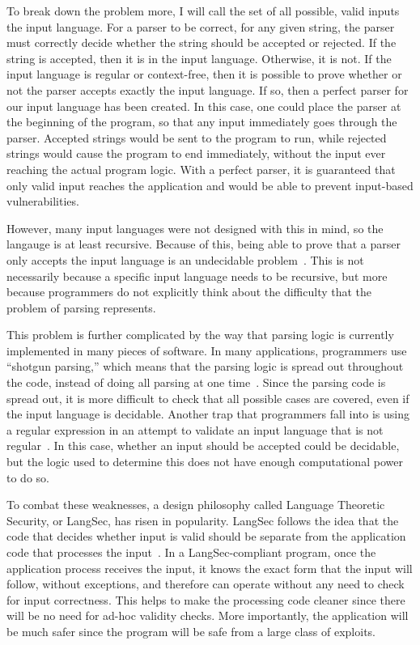 To break down the problem more, I will call the set of all possible, valid inputs the input language.  For a parser to be correct, for any given string, the parser must correctly decide whether the string should be accepted or rejected.  If the string is accepted, then it is in the input language.  Otherwise, it is not.  If the input language is regular or context-free, then it is possible to prove whether or not the parser accepts exactly the input language.  If so, then a perfect parser for our input language has been created.  In this case, one could place the parser at the beginning of the program, so that any input immediately goes through the parser.  Accepted strings would be sent to the program to run, while rejected strings would cause the program to end immediately, without the input ever reaching the actual program logic.  With a perfect parser, it is guaranteed that only valid input reaches the application and would be able to prevent input-based vulnerabilities.

However, many input languages were not designed with this in mind, so the langauge is at least recursive.  Because of this, being able to prove that a parser only accepts the input language is an undecidable problem~\cite{sassaman2011halting}.  This is not necessarily because a specific input language needs to be recursive, but more because programmers do not explicitly think about the difficulty that the problem of parsing represents.

This problem is further complicated by the way that parsing logic is currently implemented in many pieces of software.  In many applications, programmers use ``shotgun parsing,'' which means that the parsing logic is spread out throughout the code, instead of doing all parsing at one time~\cite{bratus2017parsing}.  Since the parsing code is spread out, it is more difficult to check that all possible cases are covered, even if the input language is decidable.  Another trap that programmers fall into is using a regular expression in an attempt to validate an input language that is not regular~\cite{bratus2017parsing}.  In this case, whether an input should be accepted could be decidable, but the logic used to determine this does not have enough computational power to do so.

To combat these weaknesses, a design philosophy called Language Theoretic Security, or LangSec, has risen in popularity.  LangSec follows the idea that the code that decides whether input is valid should be separate from the application code that processes the input~\cite{langsec_language-theoretic_security}.  In a LangSec-compliant program, once the application process receives the input, it knows the exact form that the input will follow, without exceptions, and therefore can operate without any need to check for input correctness.  This helps to make the processing code cleaner since there will be no need for ad-hoc validity checks.  More importantly, the application will be much safer since the program will be safe from a large class of exploits.


